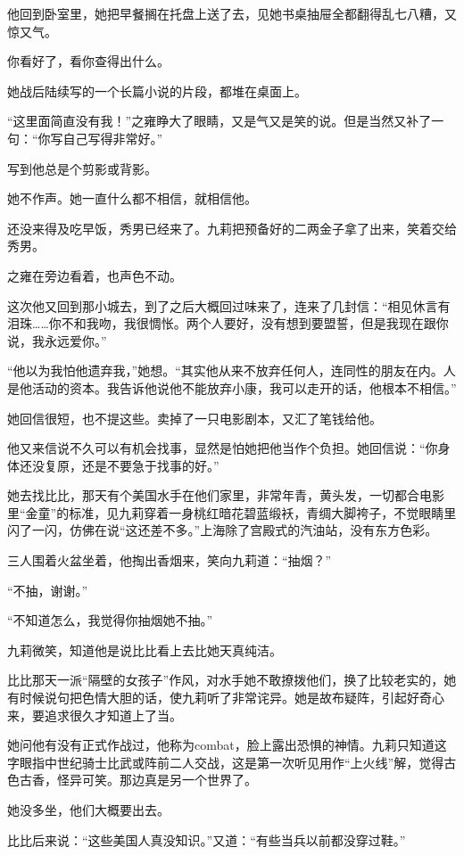 \par 他回到卧室里，她把早餐搁在托盘上送了去，见她书桌抽屉全都翻得乱七八糟，又惊又气。
\par 你看好了，看你查得出什么。
\par 她战后陆续写的一个长篇小说的片段，都堆在桌面上。
\par “这里面简直没有我！”之雍睁大了眼睛，又是气又是笑的说。但是当然又补了一句：“你写自己写得非常好。”
\par 写到他总是个剪影或背影。
\par 她不作声。她一直什么都不相信，就相信他。
\par 还没来得及吃早饭，秀男已经来了。九莉把预备好的二两金子拿了出来，笑着交给秀男。
\par 之雍在旁边看着，也声色不动。
\par 这次他又回到那小城去，到了之后大概回过味来了，连来了几封信：“相见休言有泪珠……你不和我吻，我很惆怅。两个人要好，没有想到要盟誓，但是我现在跟你说，我永远爱你。”
\par “他以为我怕他遗弃我，”她想。“其实他从来不放弃任何人，连同性的朋友在内。人是他活动的资本。我告诉他说他不能放弃小康，我可以走开的话，他根本不相信。”
\par 她回信很短，也不提这些。卖掉了一只电影剧本，又汇了笔钱给他。
\par 他又来信说不久可以有机会找事，显然是怕她把他当作个负担。她回信说：“你身体还没复原，还是不要急于找事的好。”
\par 她去找比比，那天有个美国水手在他们家里，非常年青，黄头发，一切都合电影里“金童”的标准，见九莉穿着一身桃红暗花碧蓝缎袄，青绸大脚袴子，不觉眼睛里闪了一闪，仿佛在说“这还差不多。”上海除了宫殿式的汽油站，没有东方色彩。
\par 三人围着火盆坐着，他掏出香烟来，笑向九莉道：“抽烟？”
\par “不抽，谢谢。”
\par “不知道怎么，我觉得你抽烟她不抽。”
\par 九莉微笑，知道他是说比比看上去比她天真纯洁。
\par 比比那天一派“隔壁的女孩子”作风，对水手她不敢撩拨他们，换了比较老实的，她有时候说句把色情大胆的话，使九莉听了非常诧异。她是故布疑阵，引起好奇心来，要追求很久才知道上了当。
\par 她问他有没有正式作战过，他称为combat，脸上露出恐惧的神情。九莉只知道这字眼指中世纪骑士比武或阵前二人交战，这是第一次听见用作“上火线”解，觉得古色古香，怪异可笑。那边真是另一个世界了。
\par 她没多坐，他们大概要出去。
\par 比比后来说：“这些美国人真没知识。”又道：“有些当兵以前都没穿过鞋。”
